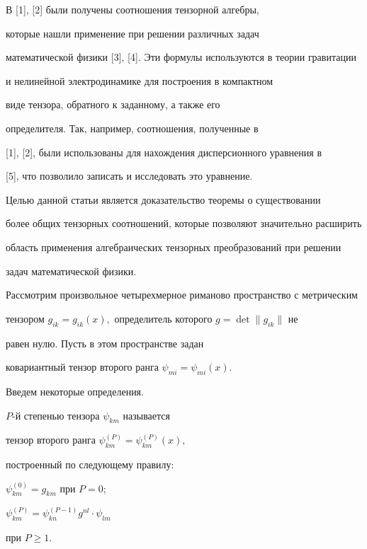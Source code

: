 В [1], [2] были получены соотношения тензорной алгебры,


которые нашли применение при решении различных задач


математической физики [3], [4]. Эти формулы используются в теории гравитации


и нелинейной электродинамике для построения в компактном


виде тензора, обратного к заданному, а также его


определителя. Так, например, соотношения, полученные в


[1], [2], были использованы для нахождения дисперсионного уравнения в


[5], что позволило записать и исследовать это уравнение.





Целью данной статьи является доказательство теоремы о существовании


более общих тензорных соотношений, которые позволяют значительно расширить


область применения  алгебраических тензорных преобразований при решении


задач математической физики.





Рассмотрим произвольное четырехмерное риманово  пространство с метрическим


тензором $g_{ik}=g_{ik}(x),$ определитель которого $g=\det\|g_{ik}\|$ не


равен нулю.  Пусть  в этом пространстве задан


ковариантный тензор  второго  ранга $\psi_{mi}=\psi_{mi}(x).$


Введем некоторые определения.





\begin{defn}


$P$-й степенью тензора $\psi_{km}$ называется


тензор второго ранга  $\psi^{(P)}_{k m}=\psi^{(P)}_{k m}(x),$


построенный по следующему правилу:


$\psi^{(0)}_{km}=g_{km}$ при $P=0$;


$\psi^{(P)}_{k m}=\psi^{(P-1)}_{k n}g^{nl}\cdot \psi_{lm}$


при $P\geq 1$.


\end{defn}





